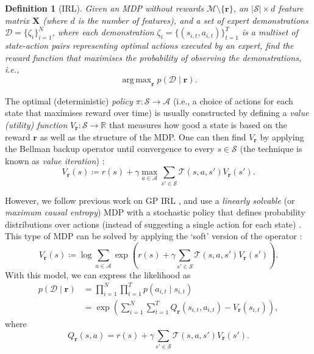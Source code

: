 \documentclass{mpaper}
\newtheorem{definition}[theorem]{Definition}
\DeclareMathOperator*{\argmax}{arg\,max}
\newcommand{\V}{V_{\mathbf{r}}}
\begin{document}
\begin{definition}[IRL]
  Given an MDP without rewards $\mathcal{M} \setminus \{ \mathbf{r} \}$, an
  $|\mathcal{S}| \times d$ feature matrix $\mathbf{X}$ (where $d$ is the number
  of features), and a set of expert demonstrations $\mathcal{D} = \{\zeta_i
  \}_{i=1}^N$, where each demonstration $\zeta_i = \{ (s_{i,t}, a_{i,t})
  \}_{t=1}^T$ is a multiset of state-action pairs representing optimal actions
  executed by an expert, find the reward function that maximises the probability
  of observing the demonstrations, i.e.,
  \[
    \argmax_{\mathbf{r}} p(\mathcal{D} \mid \mathbf{r}).
  \]
\end{definition}

The optimal (deterministic) \emph{policy} $\pi : \mathcal{S} \to \mathcal{A}$
(i.e., a choice of actions for each state that maximises reward over time) is
usually constructed by defining a \emph{value (utility) function} $\V :
\mathcal{S} \to \mathbb{R}$ that measures how good a state is based on the
reward $\mathbf{r}$ as well as the structure of the MDP. One can then find $\V$
by applying the Bellman backup operator until convergence to every $s \in
\mathcal{S}$ (the technique is known as \emph{value iteration})
\cite{DBLP:books/daglib/0023820}:
\[
  V_{\mathbf{r}}(s) \coloneqq r(s) + \gamma \max_{a \in \mathcal{A}} \sum_{s' \in
    \mathcal{S}} \mathcal{T}(s, a, s')V_{\mathbf{r}}(s').
\]

However, we follow previous work on GP IRL
\cite{DBLP:conf/nips/LevinePK11,DBLP:conf/uai/JinDAS17}, and use a
\emph{linearly solvable} (or \emph{maximum causal entropy}) MDP with a
stochastic policy that defines probability distributions over actions (instead
of suggesting a single action for each state) \cite{ziebart2008maximum}. This
type of MDP can be solved by applying the `soft' version of the operator
\cite{DBLP:conf/nips/LevinePK11,supplementary_material}:
\begin{equation} \label{eq:update_rule}
  \V(s) \coloneqq \log \sum_{a \in \mathcal{A}} \exp\left( r(s) + \gamma\sum_{s'
      \in \mathcal{S}} \mathcal{T}(s, a, s')\V(s') \right).
\end{equation}
With this model, we can express the likelihood as
\cite{DBLP:conf/uai/JinDAS17,DBLP:conf/nips/LevinePK11}
\begin{align*}
  p(\mathcal{D} \mid \mathbf{r}) &= \prod_{i=1}^N \prod_{t=1}^T p(a_{i,t} \mid s_{i,t}) \\
                                 &= \exp\left( \sum_{i=1}^N \sum_{t=1}^T Q_{\mathbf{r}}(s_{i,t}, a_{i,t}) - \V(s_{i,t}) \right),
\end{align*}
where
\[
  Q_{\mathbf{r}}(s, a) = r(s) + \gamma\sum_{s' \in \mathcal{S}}
  \mathcal{T}(s, a, s')\V(s').
\]
\end{document}
